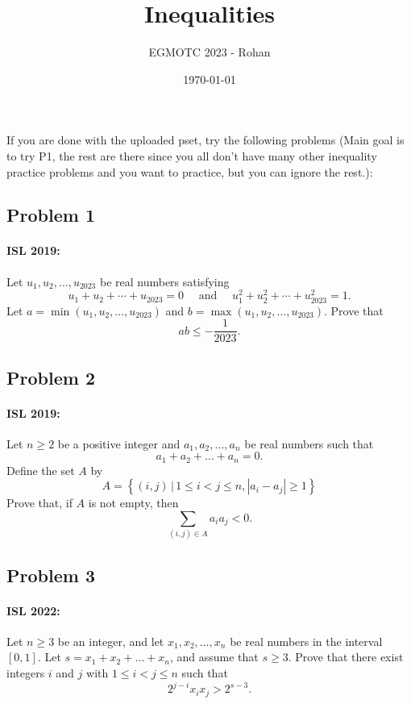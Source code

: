 \documentclass[12pt]{article}
\title{Inequalities}
\author{EGMOTC 2023 - Rohan}
\date{\today}
\begin{document}
\maketitle

\newcommand{\localtextbulletone}{\textcolor{black}{\raisebox{.45ex}{\rule{.6ex}{.6ex}}}}
\renewcommand{\labelitemi}{\localtextbulletone}

\newtheorem{definition}{Definition}
\newtheorem{theorem}{Theorem}
\newtheorem{corollary}{Corollary}

\thispagestyle{empty}

If you are done with the uploaded pset, try the following problems (Main goal is to try P1, the rest are there since you all don't have many other inequality practice problems and you want to practice, but you can ignore the rest.):

\subsection*{Problem 1}
\paragraph*{ISL 2019:} Let $u_1, u_2, \dots, u_{2023}$ be real numbers satisfying\[u_{1}+u_{2}+\cdots+u_{2023}=0 \quad \text { and } \quad u_{1}^{2}+u_{2}^{2}+\cdots+u_{2023}^{2}=1.\]Let $a=\min \left(u_{1}, u_{2}, \ldots, u_{2023}\right)$ and $b=\max \left(u_{1}, u_{2}, \ldots, u_{2023}\right)$. Prove that
\[
ab \leqslant-\frac{1}{2023}.
\]

\subsection*{Problem 2}
\paragraph*{ISL 2019:} Let $n\geqslant 2$ be a positive integer and $a_1,a_2, \ldots ,a_n$ be real numbers such that\[a_1+a_2+\dots+a_n=0.\]Define the set $A$ by
\[A=\left\{(i, j)\,|\,1 \leqslant i<j \leqslant n,\left|a_{i}-a_{j}\right| \geqslant 1\right\}\]Prove that, if $A$ is not empty, then
\[\sum_{(i, j) \in A} a_{i} a_{j}<0.\]

\subsection*{Problem 3}
\paragraph*{ISL 2022:} Let $n \geqslant 3$ be an integer, and let $x_1,x_2,\ldots,x_n$ be real numbers in the interval $[0,1]$. Let $s=x_1+x_2+\ldots+x_n$, and assume that $s \geqslant 3$. Prove that there exist integers $i$ and $j$ with $1 \leqslant i<j \leqslant n$ such that\[2^{j-i}x_ix_j>2^{s-3}.\]
\end{document}
